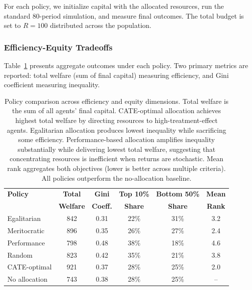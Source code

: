 For each policy, we initialize capital with the allocated resources, run
the standard 80-period simulation, and measure final outcomes. The total
budget is set to $R = 100$ distributed across the population.

\subsubsection{Efficiency-Equity Tradeoffs}

Table~\ref{tab:policy_comparison} presents aggregate outcomes under each
policy. Two primary metrics are reported: total welfare (sum of final
capital) measuring efficiency, and Gini coefficient measuring inequality.

\begin{table}[H]
  \centering
  \begin{tabular}{lccccc}
    \toprule \textbf{Policy} & \textbf{Total}   & \textbf{Gini}   & \textbf{Top 10\%} & \textbf{Bottom 50\%} & \textbf{Mean} \\
                             & \textbf{Welfare} & \textbf{Coeff.} & \textbf{Share}    & \textbf{Share}       & \textbf{Rank} \\
    \midrule Egalitarian     & 842              & 0.31            & 22\%              & 31\%                 & 3.2           \\
    Meritocratic             & 896              & 0.35            & 26\%              & 27\%                 & 2.4           \\
    Performance              & 798              & 0.48            & 38\%              & 18\%                 & 4.6           \\
    Random                   & 823              & 0.42            & 35\%              & 21\%                 & 3.8           \\
    CATE-optimal             & 921              & 0.37            & 28\%              & 25\%                 & 2.0           \\
    \midrule No allocation   & 743              & 0.38            & 28\%              & 25\%                 & --            \\
    \bottomrule
  \end{tabular}
  \caption{Policy comparison across efficiency and equity dimensions. Total
  welfare is the sum of all agents' final capital. CATE-optimal allocation
  achieves highest total welfare by directing resources to high-treatment-effect
  agents. Egalitarian allocation produces lowest inequality while
  sacrificing some efficiency. Performance-based allocation amplifies inequality
  substantially while delivering lowest total welfare, suggesting that
  concentrating resources is inefficient when returns are stochastic. Mean
  rank aggregates both objectives (lower is better across multiple
  criteria). All policies outperform the no-allocation baseline.}
  \label{tab:policy_comparison}
\end{table}

